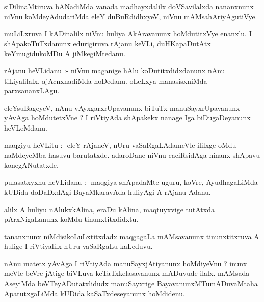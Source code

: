 \documentclass{article}
\begin{document}
\begin{mn}
siDilinaMtiruva  bANadiMda  vanada  madhayxdalilx  doVSavilalxda  nananxnunx  
niVnu  koMdeyAdudariMda  eleY  duBuRdidhxyeV,  niVnu  mAMsahAriyAgutiVye.
\end{mn}

\begin{mn}
muLiLxruva  I  kADinalilx  niVnu  huliya  AkAravanunx  hoMdutitxVye  enanxlu.  I  
shApakoTuTxdanunx  edurigiruva  rAjanu  keVLi,  duHKapaDutAtx  keYmugidukoMDu  A  jiMkegiMtedanu.
\end{mn}

\begin{mn}
rAjanu  heVLidanu :- niVnu  maganige  hAlu  koDutitxdidxdanunx  nAnu  tiLiyalilalx.  
ajAcnxnadiMda  hoDedanu.  oLeLxya  manasisxniMda  parxsananxLAgu.
\end{mn}

\begin{mn}
eleYsuBageyeV,  nAnu  vAyxgarxrUpavanunx  biTuTx  manuSayxrUpavanunx  yAvAga  
hoMdutetxVne ?  I riVtiyAda  shApakekx  nanage  Iga  biDugaDeyanunx  heVLeMdanu.
\end{mn}

\begin{mn}
maqgiyu  heVLitu :-  eleY  rAjaneV,  nUru  vaSaRgaLAdameVle  ililxge  oMdu  naMdeyeMba 
hasuvu  barutatxde.  adaroDane  niVnu  caciRsidAga  ninanx  shApavu  konegANutatxde.
\end{mn}

\begin{mn}
pulasatxyxnu  heVLidanu :- maqgiya  shApadaMte  uguru,  koVre,  AyudhagaLiMda  
kUDida  doDaDxdAgi  BayaMkaravAda  huliyAgi  A  rAjanu  Adanu.
\end{mn}

\begin{mn}
alilx  A huliyu  nAlukxkAlina,  eraDu  kAlina,  maqtuyxvige  tutAtxda  
pArxNigaLanunx  koMdu  tinunxtitxdidxtu.
\end{mn}

\begin{mn}
tananxnunx  niMdisikoLuLxtitxdadx  maqgagaLa  mAMsavanunx  tinunxtitxruva  
A  hulige  I riVtiyalilx  nUru  vaSaRgaLu  kaLeduvu.
\end{mn}

\begin{mn}
nAnu  matetx  yAvAga  I riVtiyAda  manuSayxjAtiyanunx  hoMdiyeVnu ?  inunx  
meVle  beVre  jAtige  biVLuva  keTaTxkelasavanunx  mADuvude  ilalx.  
mAMsada  AseyiMda  beVTeyADutatxlidudx  manuSayxrige  BayavanunxMTumADuvaMtaha  
ApatutxgaLiMda  kUDida  kaSaTxdeseyanunx  hoMdidenu.
\end{mn}
\end{document}
